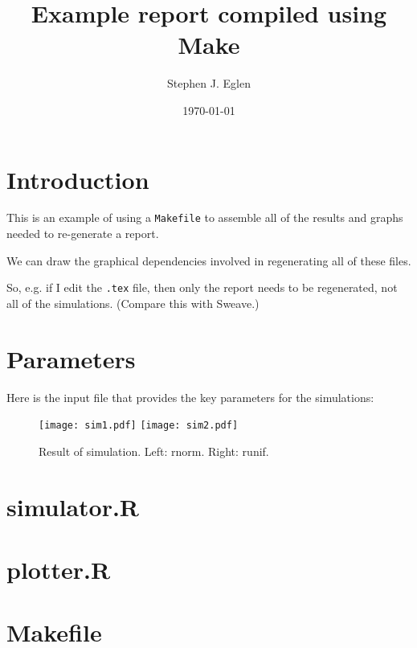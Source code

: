 \documentclass{article}
\begin{document}
\title{Example report compiled using Make}
\author{Stephen J. Eglen}
\date{\today}
\maketitle


\section{Introduction}

This is an example of using a \texttt{Makefile} to assemble all of the results
and graphs needed to re-generate a report.  

We can draw the graphical dependencies involved in regenerating all of
these files.

So, e.g. if I edit the \texttt{.tex} file, then only the report needs to be
regenerated, not all of the simulations.  (Compare this with Sweave.)


\section{Parameters}

Here is the input file that provides the key parameters for the
simulations:

{}

\begin{figure}[h]
  \centering
  \texttt{[image: sim1.pdf]}
  \texttt{[image: sim2.pdf]}
  \caption{Result of simulation. Left: rnorm.  Right: runif.}
  \label{fig:res}
\end{figure}

\clearpage


\section{simulator.R}



\section{plotter.R}


\section{Makefile}

\end{document}
